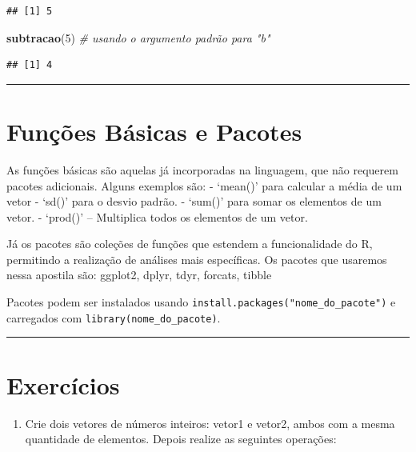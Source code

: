 \documentclass[
]{book}
\newenvironment{Shaded}{\begin{snugshade}}{\end{snugshade}}
\newcommand{\CommentTok}[1]{\textcolor[rgb]{0.56,0.35,0.01}{\textit{#1}}}
\newcommand{\DecValTok}[1]{\textcolor[rgb]{0.00,0.00,0.81}{#1}}
\newcommand{\FunctionTok}[1]{\textcolor[rgb]{0.13,0.29,0.53}{\textbf{#1}}}
\newcommand{\NormalTok}[1]{#1}
\providecommand{\tightlist}{%
  \setlength{\itemsep}{0pt}\setlength{\parskip}{0pt}}
\begin{document}
\begin{verbatim}
## [1] 5
\end{verbatim}

\begin{Shaded}
\begin{Highlighting}[]
\FunctionTok{subtracao}\NormalTok{(}\DecValTok{5}\NormalTok{) }\CommentTok{\# usando o argumento padrão para "b"}
\end{Highlighting}
\end{Shaded}

\begin{verbatim}
## [1] 4
\end{verbatim}

\begin{center}\rule{0.5\linewidth}{0.5pt}\end{center}

\section{Funções Básicas e Pacotes}\label{funuxe7uxf5es-buxe1sicas-e-pacotes}

As funções básicas são aquelas já incorporadas na linguagem, que não requerem pacotes adicionais. Alguns exemplos são:
- `mean()' para calcular a média de um vetor
- `sd()' para o desvio padrão.
- `sum()' para somar os elementos de um vetor.
- `prod()' -- Multiplica todos os elementos de um vetor.

Já os pacotes são coleções de funções que estendem a funcionalidade do R, permitindo a realização de análises mais específicas. Os pacotes que usaremos nessa apostila são: ggplot2, dplyr, tdyr, forcats, tibble

Pacotes podem ser instalados usando \texttt{install.packages("nome\_do\_pacote")} e carregados com \texttt{library(nome\_do\_pacote)}.

\begin{center}\rule{0.5\linewidth}{0.5pt}\end{center}

\section{Exercícios}\label{exercuxedcios}

\begin{enumerate}
\def\labelenumi{\arabic{enumi})}
\tightlist
\item
  Crie dois vetores de números inteiros: vetor1 e vetor2, ambos com a mesma quantidade de elementos. Depois realize as seguintes operações:
\end{enumerate}
\end{document}
